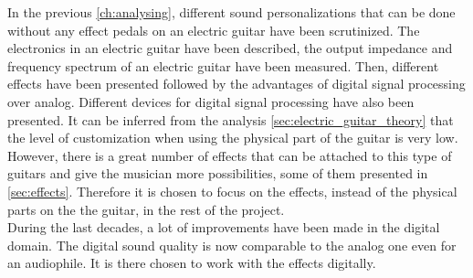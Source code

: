 In the previous \autoref{ch:analysing}, different sound personalizations that can be done without any effect pedals on an electric guitar have been scrutinized. The electronics in an electric guitar have been described, the output impedance and frequency spectrum of an electric guitar have been measured. Then, different effects have been presented followed by the advantages of digital signal processing over analog. Different devices for digital signal processing have also been presented. 
It can be inferred from the analysis \autoref{sec:electric_guitar_theory} that the level of customization when using the physical part of the guitar is very low. However, there is a great number of effects that can be attached to this type of guitars and give the musician more possibilities, some of them presented in \autoref{sec:effects}. Therefore it is chosen to focus on the effects, instead of the physical parts on the the guitar, in the rest of the project.  \\
During the last decades, a lot of improvements have been made in the digital domain. The digital sound quality is now comparable to the analog one even for an audiophile. It is there chosen to work with the effects digitally.
